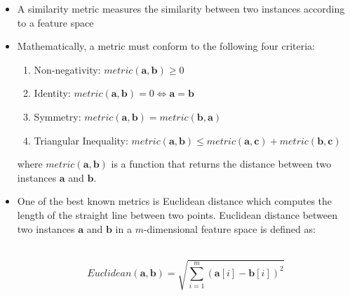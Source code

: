 \documentclass[xcolor={table}]{beamer}
\begin{document}
\begin{frame}
\begin{itemize}
\item A \alert{similarity metric} measures the similarity between two instances according to a feature space
\item Mathematically, a \alert{metric} must conform to the following four criteria:
\begin{enumerate}
	\item \alert{Non-negativity}: $metric(\textbf{a},\textbf{b}) \geq 0$
	\item \alert{Identity}: $metric(\textbf{a},\textbf{b}) = 0 \Longleftrightarrow \textbf{a}=\textbf{b}$ 
	\item \alert{Symmetry}: $metric(\textbf{a},\textbf{b}) = metric(\textbf{b},\textbf{a})$
	\item \alert{Triangular Inequality}: $metric(\textbf{a},\textbf{b}) \leq metric(\textbf{a},\textbf{c}) + metric(\textbf{b},\textbf{c})$
\end{enumerate}

where $metric(\textbf{a},\textbf{b})$ is a function that returns the distance between two instances $\textbf{a}$ and $\textbf{b}$.
\end{itemize}
\end{frame} 

 \begin{frame} 
 \begin{itemize}
\item One of the best known metrics is \alert{Euclidean distance} which computes the length of the straight line between two points. Euclidean distance between two instances $\textbf{a}$ and $\textbf{b}$ in a $m$-dimensional feature space is defined as: 

~~\\

\begin{equation}
Euclidean(\textbf{a},\textbf{b}) = \sqrt{\sum_{i=1}^{m} \left(\textbf{a}[i] - \textbf{b}[i]\right)^2}
\label{eq:euclid}
\end{equation}
\end{itemize}
\end{frame} 
\end{document}
